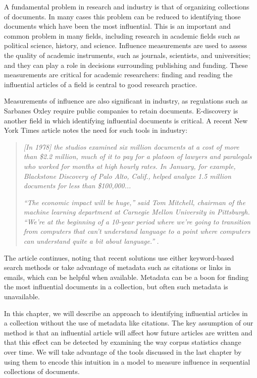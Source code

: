 \label{chapter:influence}

A fundamental problem in research and industry is that of organizing
collections of documents.  In many cases this problem can be reduced
to identifying those documents which have been the most influential.
This is an important and common problem in many fields, including
research in academic fields such as political science, history, and
science.  Influence measurements are used to assess the quality of
academic instruments, such as journals, scientists, and universities;
and they can play a role in decisions surrounding publishing and
funding. These measurements are critical for academic researchers:
finding and reading the influential articles of a field is central to
good research practice.

Measurements of influence are also significant in industry, as
regulations such as Sarbanes Oxley require public companies to retain
documents.  E-discovery is another field in which identifying influential
documents is critical.  A recent New York Times article notes the
need for such tools in industry:
\begin{quote}
  \emph{[In 1978] the studios examined six million documents at a
    cost of more than \$2.2 million, much of it to pay for a platoon
    of lawyers and paralegals who worked for months at high hourly
    rates.  In January, for example, Blackstone Discovery of Palo
    Alto, Calif., helped analyze 1.5 million documents for less than
    \$100,000...}

  \emph{``The economic impact will be huge,'' said Tom Mitchell, chairman
    of the machine learning department at Carnegie Mellon University
    in Pittsburgh. ``We’re at the beginning of a 10-year period where
    we’re going to transition from computers that can't understand
    language to a point where computers can understand quite a bit
    about language.''} \citep{markoff:2011}.
\end{quote}
The article continues, noting that recent solutions use either
keyword-based search methods or take advantage of metadata such as
citations or links in emails, which can be helpful when available.
Metadata can be a boon for finding the most influential documents in a
collection, but often such metadata is unavailable.

In this chapter, we will describe an approach to identifying
influential articles in a collection without the use of metadata like
citations.  The key assumption of our method is that an influential
article will affect how future articles are written and that this
effect can be detected by examining the way corpus statistics change
over time.  We will take advantage of the tools discussed in the last
chapter by using them to encode this intuition in a model to measure
influence in sequential collections of documents.

